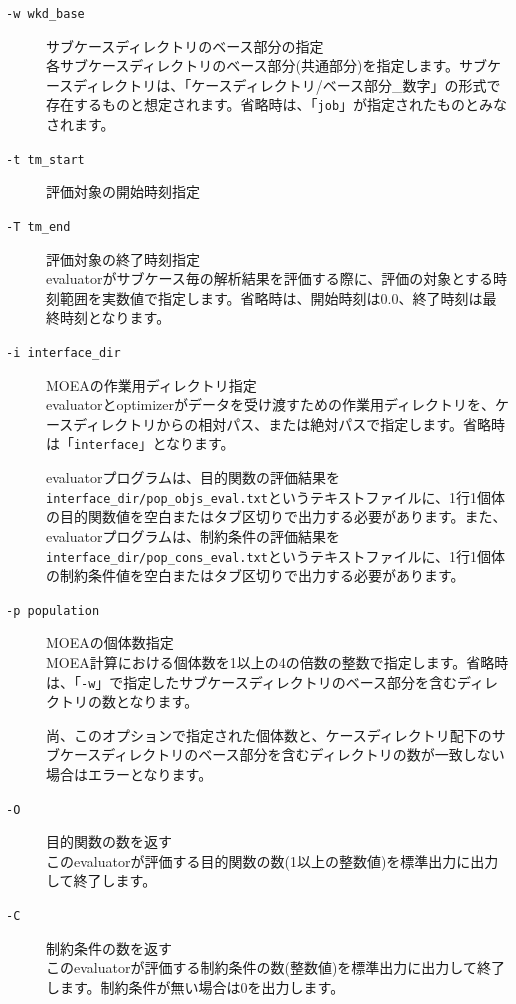\documentclass[a4paper,11pt]{jarticle}
\begin{document}
{\begin{description}
\begin{description}
\item[{\tt -w  wkd\_base}] サブケースディレクトリのベース部分の指定\\
各サブケースディレクトリのベース部分(共通部分)を指定します。サブケースディレクトリは、「ケースディレクトリ/ベース部分\_数字」の形式で存在するものと想定されます。省略時は、「{\tt job}」が指定されたものとみなされます。\\

\item[{\tt -t  tm\_start}] 評価対象の開始時刻指定
\item[{\tt -T  tm\_end}] 評価対象の終了時刻指定\\
evaluatorがサブケース毎の解析結果を評価する際に、評価の対象とする時刻範囲を実数値で指定します。省略時は、開始時刻は0.0、終了時刻は最終時刻となります。\\

\item[{\tt -i  interface\_dir}] MOEAの作業用ディレクトリ指定\\
evaluatorとoptimizerがデータを受け渡すための作業用ディレクトリを、ケースディレクトリからの相対パス、または絶対パスで指定します。省略時は「{\tt interface}」となります。

evaluatorプログラムは、目的関数の評価結果を{\tt interface\_dir/pop\_objs\_eval.txt}というテキストファイルに、1行1個体の目的関数値を空白またはタブ区切りで出力する必要があります。また、evaluatorプログラムは、制約条件の評価結果を{\tt interface\_dir/pop\_cons\_eval.txt}というテキストファイルに、1行1個体の制約条件値を空白またはタブ区切りで出力する必要があります。\\

\item[{\tt -p  population}] MOEAの個体数指定\\
MOEA計算における個体数を1以上の4の倍数の整数で指定します。省略時は、「{\tt -w}」で指定したサブケースディレクトリのベース部分を含むディレクトリの数となります。

尚、このオプションで指定された個体数と、ケースディレクトリ配下のサブケースディレクトリのベース部分を含むディレクトリの数が一致しない場合はエラーとなります。\\

\item[{\tt -O}] 目的関数の数を返す\\
このevaluatorが評価する目的関数の数(1以上の整数値)を標準出力に出力して終了します。\\

\item[{\tt -C}] 制約条件の数を返す\\
このevaluatorが評価する制約条件の数(整数値)を標準出力に出力して終了します。制約条件が無い場合は0を出力します。\\


\end{description}
\end{description}}
\end{document}
